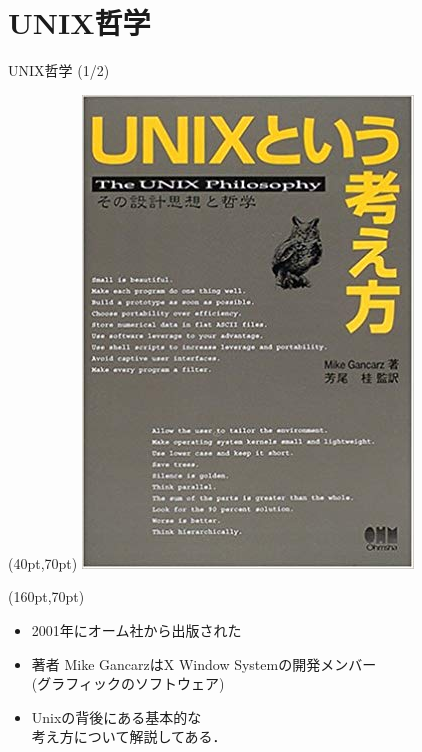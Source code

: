 \documentclass[uplatex, dvipdfmx, 12pt]{beamer}
\begin{document}
\section{UNIX哲学}
\begin{frame}{UNIX哲学 (1/2)}
  \begin{textblock*}{0.4\linewidth}(40pt,70pt)
    \centering
    \includegraphics[width=\linewidth]{./figures/Unixph.jpg}
  \end{textblock*}
  \begin{textblock*}{0.6\linewidth}(160pt,70pt)
    \begin{itemize}
          \setlength\itemsep{2em}
      \item 2001年にオーム社から出版された
      \item 著者 Mike GancarzはX Window Systemの開発メンバー \\(グラフィックのソフトウェア)
      \item Unixの背後にある基本的な\\考え方について解説してある．
    \end{itemize}
  \end{textblock*}
\end{frame}
\end{document}
